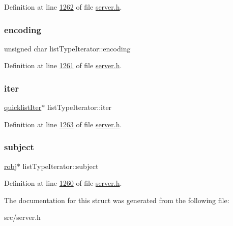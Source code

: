 Definition at line \hyperlink{server_8h_source_l01262}{1262} of file \hyperlink{server_8h_source}{server.\+h}.

\mbox{\label{structlistTypeIterator_a296c8eeccc5d8fc68c8be9aa31f1582b}} 
\subsubsection{\texorpdfstring{encoding}{encoding}}
{\footnotesize\ttfamily unsigned char list\+Type\+Iterator\+::encoding}



Definition at line \hyperlink{server_8h_source_l01261}{1261} of file \hyperlink{server_8h_source}{server.\+h}.

\mbox{\label{structlistTypeIterator_a82bd85b42db8ab505d7af9b544dc440a}} 
\subsubsection{\texorpdfstring{iter}{iter}}
{\footnotesize\ttfamily \hyperlink{structquicklistIter}{quicklist\+Iter}$\ast$ list\+Type\+Iterator\+::iter}



Definition at line \hyperlink{server_8h_source_l01263}{1263} of file \hyperlink{server_8h_source}{server.\+h}.

\mbox{\label{structlistTypeIterator_a66eb5a4e71c1a5b13b55f1f0578a1cab}} 
\subsubsection{\texorpdfstring{subject}{subject}}
{\footnotesize\ttfamily \hyperlink{structredisObject}{robj}$\ast$ list\+Type\+Iterator\+::subject}



Definition at line \hyperlink{server_8h_source_l01260}{1260} of file \hyperlink{server_8h_source}{server.\+h}.



The documentation for this struct was generated from the following file\+:\begin{DoxyCompactItemize}
\item 
src/server.\+h\end{DoxyCompactItemize}
